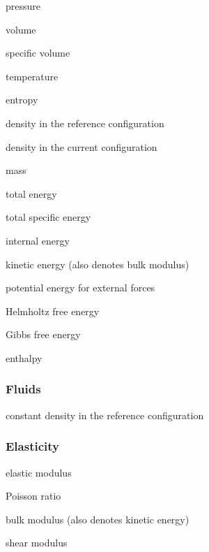 \begin{description}[noitemsep,align=right,labelwidth=1.5cm,labelsep=0.8cm]
\item [$P$] pressure
\item [$V$] volume 
\item [$\svol$] specific volume
\item [$T$] temperature
\item [$S$] entropy
\item [$\rho_0$] density in the reference configuration
\item [$\rho$] density in the current configuration 
\item [$m$] mass
\item 
\item [$E$] total energy
\item [$\senergy$] total specific energy
\item
\item [$U$] internal energy
\item [$K$] kinetic energy (also denotes bulk modulus)
\item [$G$] potential energy for external forces
\item 
\item [$\helmholtz$] Helmholtz free energy
\item [$\gibbs$] Gibbs free energy
\item [$\mathcal{H}$] enthalpy
\end{description}

\subsubsection*{Fluids}

\begin{description}[noitemsep,align=right,labelwidth=1.5cm,labelsep=0.8cm]
\item [$\bar\rho_0$] constant density in the reference configuration
\end{description}

\subsubsection*{Elasticity}

\begin{description}[noitemsep,align=right,labelwidth=1.5cm,labelsep=0.8cm]
\item [$E$] elastic modulus 
\item [$\nu$] Poisson ratio 
\item 
\item [$K$] bulk modulus (also denotes kinetic energy)
\item [$G$] shear modulus
\end{description}

